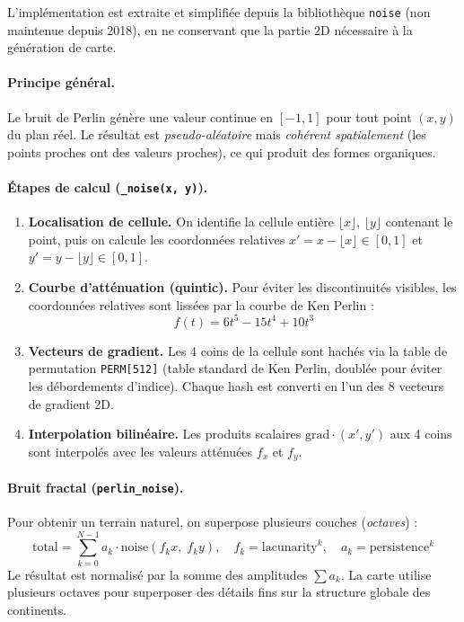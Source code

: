 \documentclass[12pt, a4paper]{article}
\begin{document}
L'implémentation est extraite et simplifiée depuis la bibliothèque \texttt{noise}
(non maintenue depuis 2018), en ne conservant que la partie 2D nécessaire à la génération
de carte.

\paragraph{Principe général.}
Le bruit de Perlin génère une valeur continue en $[-1, 1]$ pour tout point $(x, y)$
du plan réel. Le résultat est \emph{pseudo-aléatoire} mais \emph{cohérent spatialement}
(les points proches ont des valeurs proches), ce qui produit des formes organiques.

\paragraph{Étapes de calcul (\texttt{\_noise(x, y)}).}
\begin{enumerate}
    \item \textbf{Localisation de cellule.} On identifie la cellule entière
          $\lfloor x \rfloor$, $\lfloor y \rfloor$ contenant le point, puis on
          calcule les coordonnées relatives $x' = x - \lfloor x \rfloor \in [0,1]$
          et $y' = y - \lfloor y \rfloor \in [0,1]$.
    \item \textbf{Courbe d'atténuation (quintic).} Pour éviter les discontinuités
          visibles, les coordonnées relatives sont lissées par la courbe de Ken Perlin :
          \[
            f(t) = 6t^5 - 15t^4 + 10t^3
          \]
    \item \textbf{Vecteurs de gradient.} Les 4 coins de la cellule sont hachés via
          la table de permutation \texttt{PERM[512]} (table standard de Ken Perlin,
          doublée pour éviter les débordements d'indice). Chaque hash est converti
          en l'un des 8 vecteurs de gradient 2D.
    \item \textbf{Interpolation bilinéaire.} Les produits scalaires
          $\text{grad} \cdot (x', y')$ aux 4 coins sont interpolés avec les
          valeurs atténuées $f_x$ et $f_y$.
\end{enumerate}

\paragraph{Bruit fractal (\texttt{perlin\_noise}).}
Pour obtenir un terrain naturel, on superpose plusieurs couches (\emph{octaves}) :
\[
  \text{total} = \sum_{k=0}^{N-1} a_k \cdot \text{noise}\!\left(f_k x,\; f_k y\right),
  \quad
  f_k = \text{lacunarity}^k, \quad a_k = \text{persistence}^k
\]
Le résultat est normalisé par la somme des amplitudes $\sum a_k$.
La carte utilise plusieurs octaves pour superposer des détails fins sur la structure
globale des continents.
\end{document}
